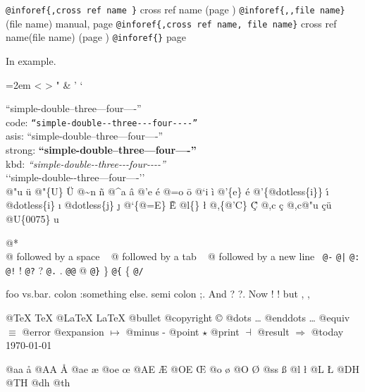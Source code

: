 \documentclass{book}
\begin{document}
\texttt{@inforef\{,cross ref name \}} cross ref name (page \pageref{anchor:})
\texttt{@inforef\{,,file name\}} (file name) manual, page \pageref{anchor:}
\texttt{@inforef\{,cross ref name, file name\}} cross ref name(file name) (page \pageref{anchor:})
\texttt{@inforef\{\}} page \pageref{anchor:}



In example.
\par\begingroup\obeylines\obeyspaces\frenchspacing\leftskip=2em\relax\parskip=0pt\relax\ttfamily{}
<
>
"
\&
'
`

``simple-double--three---four----''\leavevmode{}\\
code: \texttt{``simple-double{-}{-}three{-}{-}{-}four{-}{-}{-}-''} \leavevmode{}\\
asis: ``simple-double--three---four----'' \leavevmode{}\\
strong: \textbf{``simple-double--three---four----''} \leavevmode{}\\
kbd: {\ttfamily\textsl{``simple-double{-}{-}three{-}{-}{-}four{-}{-}{-}-''}} \leavevmode{}\\

`\hbox{}`simple-double-\hbox{}-three---four----'\hbox{}'\leavevmode{}\\


@"u \"{u} 
@"\{U\} \"{U} 
@\~{}n \~{n}
@\^{}a \^{a}
@'e \'{e}
@=o \={o}
@`i \`{i}
@'\{e\} \'{e}
@'\{@dotless\{i\}\} \'{\i{}} 
@dotless\{i\} \i{}
@dotless\{j\} \j{}
@`\{@=E\} \`{\={E}} 
@l\{\} \l{}
@,\{@'C\} \c{\'{C}}
@,c \c{c}
@,c@"u \c{c}\"{u} \leavevmode{}\\

@U\{0075\} u

@* \leavevmode{}\\
@ followed by a space
\ {}
@ followed by a tab
\ {}
@ followed by a new line
\ {}\texttt{@-} \-{}
\texttt{@|} 
\texttt{@:} \@
\texttt{@!} \@!
\texttt{@?} \@?
\texttt{@.} \@.
\texttt{@@} @
\texttt{@\}} \}
\texttt{@\{} \{
\texttt{@/} 

foo vs.\@ bar. 
colon :\@And something else.
semi colon ;\@.
And ? ?\@.
Now ! !\@@
but , ,\@

@TeX \TeX{}
@LaTeX \LaTeX{}
@bullet \textbullet{}
@copyright \copyright{}
@dots \dots{}\@
@enddots \dots{}
@equiv $\equiv{}$
@error 
@expansion $\mapsto{}$
@minus -
@point $\star{}$
@print $\dashv{}$
@result $\Rightarrow{}$
@today \today{}

@aa \aa{}
@AA \AA{}
@ae \ae{}
@oe \oe{}
@AE \AE{}
@OE \OE{}
@o \o{}
@O \O{}
@ss \ss{}
@l \l{}
@L \L{}
@DH \DH{}
@TH \TH{}
@dh \dh{}
@th \th{}
\end{document}
